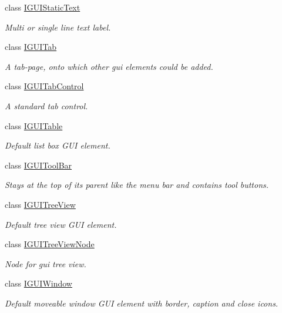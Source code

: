 \begin{DoxyCompactItemize}
class \hyperlink{classirr_1_1gui_1_1IGUIStaticText}{I\+G\+U\+I\+Static\+Text}
\begin{DoxyCompactList}\small\item\em Multi or single line text label. \end{DoxyCompactList}\item 
class \hyperlink{classirr_1_1gui_1_1IGUITab}{I\+G\+U\+I\+Tab}
\begin{DoxyCompactList}\small\item\em A tab-\/page, onto which other gui elements could be added. \end{DoxyCompactList}\item 
class \hyperlink{classirr_1_1gui_1_1IGUITabControl}{I\+G\+U\+I\+Tab\+Control}
\begin{DoxyCompactList}\small\item\em A standard tab control. \end{DoxyCompactList}\item 
class \hyperlink{classirr_1_1gui_1_1IGUITable}{I\+G\+U\+I\+Table}
\begin{DoxyCompactList}\small\item\em Default list box G\+UI element. \end{DoxyCompactList}\item 
class \hyperlink{classirr_1_1gui_1_1IGUIToolBar}{I\+G\+U\+I\+Tool\+Bar}
\begin{DoxyCompactList}\small\item\em Stays at the top of its parent like the menu bar and contains tool buttons. \end{DoxyCompactList}\item 
class \hyperlink{classirr_1_1gui_1_1IGUITreeView}{I\+G\+U\+I\+Tree\+View}
\begin{DoxyCompactList}\small\item\em Default tree view G\+UI element. \end{DoxyCompactList}\item 
class \hyperlink{classirr_1_1gui_1_1IGUITreeViewNode}{I\+G\+U\+I\+Tree\+View\+Node}
\begin{DoxyCompactList}\small\item\em Node for gui tree view. \end{DoxyCompactList}\item 
class \hyperlink{classirr_1_1gui_1_1IGUIWindow}{I\+G\+U\+I\+Window}
\begin{DoxyCompactList}\small\item\em Default moveable window G\+UI element with border, caption and close icons. \end{DoxyCompactList}\item 

\end{DoxyCompactItemize}
